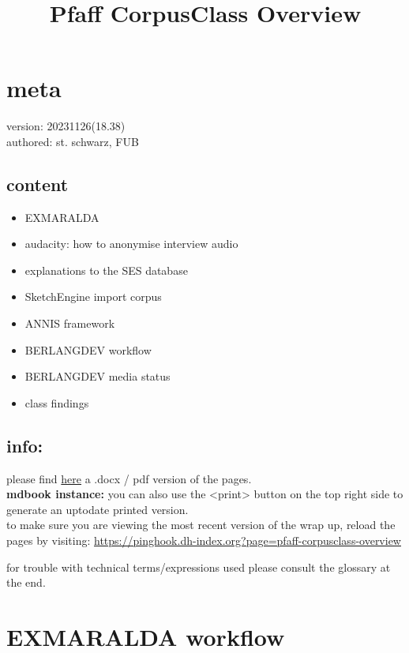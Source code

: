 \documentclass[
  12pt,
]{article}
\title{Pfaff CorpusClass Overview}
\author{}
\date{\vspace{-2.5em}}
\providecommand{\tightlist}{%
  \setlength{\itemsep}{0pt}\setlength{\parskip}{0pt}}
\begin{document}
\maketitle

{
\hypersetup{linkcolor=}
\setcounter{tocdepth}{2}
\tableofcontents
}
\hypertarget{meta}{%
\section{meta}\label{meta}}

version: 20231126(18.38)\\
authored: st. schwarz, FUB

\hypertarget{content}{%
\subsection{content}\label{content}}

\begin{itemize}
\tightlist
\item
  EXMARALDA
\item
  audacity: how to anonymise interview audio
\item
  explanations to the SES database
\item
  SketchEngine import corpus
\item
  ANNIS framework
\item
  BERLANGDEV workflow
\item
  BERLANGDEV media status
\item
  class findings
\end{itemize}

\hypertarget{info}{%
\subsection{info:}\label{info}}

please find \href{https://box.fu-berlin.de/s/Hr7Fad5bTjSmtKT}{here} a
.docx / pdf version of the pages.\\
\textbf{mdbook instance:} you can also use the
\textless print\textgreater{} button on the top right side to generate
an uptodate printed version.\\
to make sure you are viewing the most recent version of the wrap up,
reload the pages by visiting:
\url{https://pinghook.dh-index.org?page=pfaff-corpusclass-overview}

for trouble with technical terms/expressions used please consult the
glossary at the end.

\hypertarget{exmaralda-workflow}{%
\section{EXMARALDA workflow}\label{exmaralda-workflow}}
\end{document}
